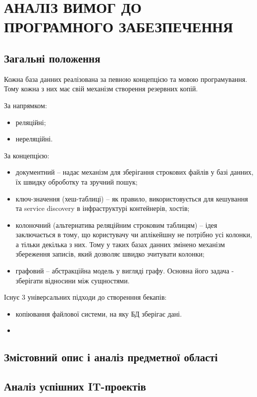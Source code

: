 \chapter{АНАЛІЗ ВИМОГ ДО ПРОГРАМНОГО ЗАБЕЗПЕЧЕННЯ}

\section{Загальні положення}
Кожна база данних реалізована за певною концепцією та мовою програмування.
Тому кожна з них має свій механізм створення резервних копій.

За напрямком:
\begin{itemize}
    \item реляційні;
    \item нереляційні.
\end{itemize}

За концепцією:
\begin{itemize}
    \item документний -- надає механізм для зберігання строкових файлів у базі данних, їх швидку оброботку та зручний пошук;
    \item ключ-значення (хеш-таблиці) -- як правило, використовується для кешування та service 
    discovery в інфраструктурі контейнерів, хостів;
    \item колоночний (альтернатива реляційним строковим таблицям) -- ідея заключається в тому,
    що користувачу чи аплікейшну не потрібно усі колонки, а тільки декілька з них.
    Тому у таких базах данних змінено механізм збереження записів,
    який дозволяє швидко зчитувати колонки;
    \item графовий -- абстракційна модель у вигляді графу. 
    Основна його задача - зберігати відносини між сущностями.
\end{itemize}

Існує 3 універсальних підходи до створенння бекапів:
\begin{itemize}
    \item копіювання файлової системи, на яку БД зберігає дані.
    \item 
\end{itemize}


\section{Змістовний опис і аналіз предметної області}

\section{Аналіз успішних IT-проектів}
